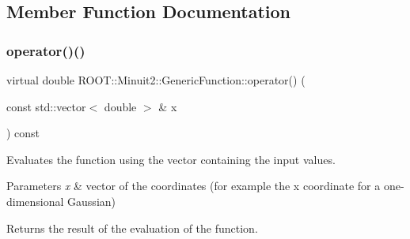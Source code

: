 \subsection{Member Function Documentation}
\mbox{\label{classROOT_1_1Minuit2_1_1GenericFunction_a0d6039ad9aa18e475534d1fd80342e9d}} 
\subsubsection{\texorpdfstring{operator()()}{operator()()}\hspace{0.1cm}{\footnotesize\ttfamily [1/2]}}
{\footnotesize\ttfamily virtual double R\+O\+O\+T\+::\+Minuit2\+::\+Generic\+Function\+::operator() (\begin{DoxyParamCaption}\item[{const std\+::vector$<$ double $>$ \&}]{x }\end{DoxyParamCaption}) const\hspace{0.3cm}{\ttfamily [pure virtual]}}

Evaluates the function using the vector containing the input values.


\begin{DoxyParams}{Parameters}
{\em x} & vector of the coordinates (for example the x coordinate for a one-\/dimensional Gaussian)\\
\hline
\end{DoxyParams}
\begin{DoxyReturn}{Returns}
the result of the evaluation of the function. 
\end{DoxyReturn}


